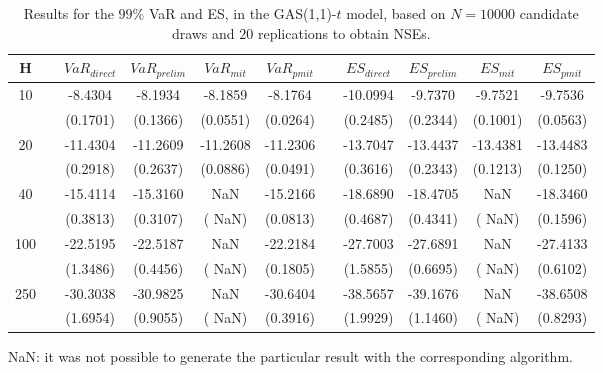 \begin{table}[h] 
\centering 
\caption{Results for the $99\%$ VaR and ES, in the GAS(1,1)-$t$ model, based on $N=10000$ candidate draws and $20$ replications to obtain NSEs.} 
\label{tab:res_algos_t_gas} 
\begin{tabular}{ccccccccccc}  
 H & & $VaR_{direct}$ & $VaR_{prelim}$ & $VaR_{mit}$  & $VaR_{pmit}$ &  & $ES_{direct}$ & $ES_{prelim}$ & $ES_{mit}$ & $ES_{pmit}$ \\ \hline 
10 & & -8.4304 & -8.1934 & -8.1859 & -8.1764 & & -10.0994 & -9.7370 & -9.7521 & -9.7536  \\ 
 & & (0.1701) & (0.1366) & (0.0551) & (0.0264) & & (0.2485) & (0.2344) & (0.1001) & (0.0563)   \\ [1ex] 
20 & & -11.4304 & -11.2609 & -11.2608 & -11.2306 & & -13.7047 & -13.4437 & -13.4381 & -13.4483  \\ 
 & & (0.2918) & (0.2637) & (0.0886) & (0.0491) & & (0.3616) & (0.2343) & (0.1213) & (0.1250)   \\ [1ex] 
40 & & -15.4114 & -15.3160 &    NaN & -15.2166 & & -18.6890 & -18.4705 &    NaN & -18.3460  \\ 
 & & (0.3813) & (0.3107) & (   NaN) & (0.0813) & & (0.4687) & (0.4341) & (   NaN) & (0.1596)   \\ [1ex] 
100 & & -22.5195 & -22.5187 &    NaN & -22.2184 & & -27.7003 & -27.6891 &    NaN & -27.4133  \\ 
 & & (1.3486) & (0.4456) & (   NaN) & (0.1805) & & (1.5855) & (0.6695) & (   NaN) & (0.6102)   \\ [1ex] 
250 & & -30.3038 & -30.9825 &    NaN & -30.6404 & & -38.5657 & -39.1676 &    NaN & -38.6508  \\ 
 & & (1.6954) & (0.9055) & (   NaN) & (0.3916) & & (1.9929) & (1.1460) & (   NaN) & (0.8293)   \\ [1ex] 
\hline 
\end{tabular} 
\raggedright 

\vspace{5pt}\footnotesize{NaN: it was not possible to generate the particular result with the corresponding algorithm.} 
\end{table} 
